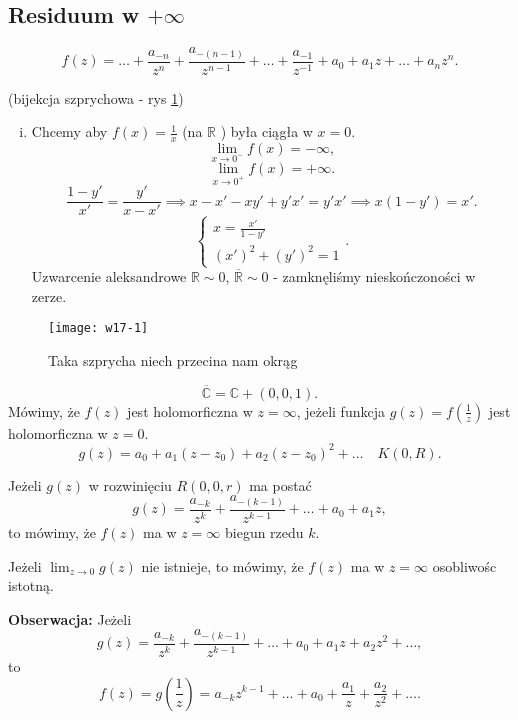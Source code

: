 \documentclass[../main.tex]{subfiles}
\begin{document}
\subsection{Residuum w $+\infty$ }
\[
    f(z) = \ldots + \frac{a_{-n}}{z^n} + \frac{a_{-(n-1)}}{z^{n-1}} + \ldots + \frac{a_{-1}}{z^{-1}} + a_0 + a_1 z + \ldots + a_n z^n
.\]
\begin{przyklad}(bijekcja szprychowa - rys \ref{fig:w17-1})
    \begin{enumerate}[i)]
        \item  Chcemy aby $f(x) = \frac{1}{x}$ (na $\mathbb{R}$ ) była ciągła w $x = 0$.
            \[
                \lim\limits_{x\to 0^-}f(x) = -\infty
            ,\]
        \[
            \lim_{x \to 0^+}f(x) = +\infty
        .\]
    \[
        \frac{1-y'}{x'} = \frac{y'}{x - x'} \implies x - x' - xy' + y'x' = y'x' \implies x(1-y') = x'
    .\]
\[
\begin{cases}
    x = \frac{x'}{1-y'}\\ \left(x'\right)^2 + \left(y'\right)^2 = 1
\end{cases}
.\]
Uzwarcenie aleksandrowe $\mathbb{R}\sim 0$, $\overline{\mathbb{R}} \sim 0$ - zamknęliśmy nieskończoności w zerze.
    \end{enumerate}
    \begin{figure}[h]
        \centering
        \texttt{[image: w17-1]}
        \caption{Taka szprycha niech przecina nam okrąg}
        \label{fig:w17-1}
    \end{figure}
\end{przyklad}

\begin{definicja}
    \[
        \overline{\mathbb{C}} = \mathbb{C} + (0,0,1)
    .\]
Mówimy, że $f(z)$ jest holomorficzna w $z = \infty$, jeżeli funkcja $g(z) = f(\frac{1}{z})$ jest holomorficzna w $z = 0$.
 \[
     g(z) = a_0 + a_1(z-z_0) + a_2(z-z_0)^2 + \ldots \quad K(0,R)
.\]
\end{definicja}
\begin{definicja}
Jeżeli  $g(z)$ w rozwinięciu $R(0,0,r)$ ma postać
\[
    g(z) = \frac{a_{-k}}{z^k} + \frac{a_{-(k-1)}}{z^{k-1}} + \ldots + a_0 + a_1z
,\]
to mówimy, że $f(z)$ ma w $z = \infty$ biegun rzedu $k$.
\end{definicja}
\begin{definicja}
    Jeżeli $\lim_{z \to 0}g(z)$ nie istnieje, to mówimy, że $f(z)$ ma w $z = \infty$ osobliwośc istotną.
\end{definicja}
\textbf{Obserwacja:} Jeżeli
\[
    g(z) = \frac{a_{-k}}{z^k} + \frac{a_{-(k-1)}}{z^{k-1}} + \ldots + a_0 + a_1z + a_2z^2 + \ldots
,\]
to
\[
    f(z) = g\left(\frac{1}{z}\right) = a_{-k}z^{k-1} + \ldots + a_0 + \frac{a_1}{z} + \frac{a_2}{z^2} + \ldots
.\]
\end{document}
